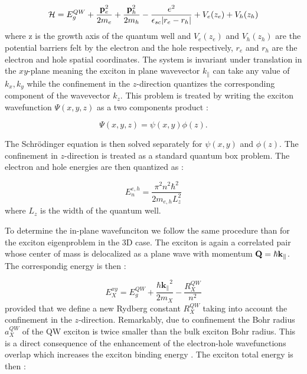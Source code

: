 \begin{equation}
    \mathcal{H} = E_g^{QW} + \dfrac{\mathbf{p}^2_e}{2m_e} + \dfrac{\mathbf{p}^2_h}{2m_h} - \dfrac{e^2}{\epsilon_{sc}|r_e-r_h|}+V_e(z_e)+V_h(z_h)
\end{equation}
where z is the growth axis of the quantum well and $V_e(z_e)$ and $V_h(z_h)$ are the potential barriers felt by the electron and the hole respectively, $r_e$ and $r_h$  are the electron and hole spatial coordinates. 
The system is invariant under translation in the $xy$-plane meaning the exciton in plane wavevector $k_{\parallel}$ can take any value of $k_x,k_y$ while the confinement in the $z$-direction quantizes the corresponding component of the wavevector $k_z$. 
This problem is treated by writing the exciton wavefunction $\Psi(x,y,z)$ as a two components product :

\begin{equation}
    \Psi(x,y,z) = \psi(x,y)\phi(z).
    \label{eq:2D_exciton_wavefunction}
\end{equation}

The Schrödinger equation is then solved separately for $\psi(x,y)$ and $\phi(z)$. 
The confinement in $z$-direction is treated as a standard quantum box problem. The electron and hole energies are then quantized as :

\begin{equation}
    E_n^{e,h} = \dfrac{\pi^2 n^2\hbar^2}{2m_{e,h}L_z^2}
    \label{eq:QW_energy_levels}
\end{equation}
where $L_z$ is the width of the quantum well.

To determine the in-plane wavefunciton we follow the same procedure than for the exciton eigenproblem in the 3D case.
The exciton is again a correlated pair whose center of mass is delocalized as a plane wave with momentum $\mathbf{Q} = \hbar \mathbf{k}_\parallel$. The correspondig energy is then  :

\begin{equation}
    E_X^{xy} = E_g^{QW} + \dfrac{\mathbf{\hbar k_{\parallel}}^2}{2m_X} - \dfrac{R_X^{QW}}{n^2}
\end{equation}
provided that we define a new Rydberg constant $R_X^{QW}$ taking into account the confinement in the $z$-direction. Remarkably, due to confinement the Bohr radius $a_X^{QW}$
of the QW exciton is twice smaller than the bulk exciton Bohr radius. This is a direct consequence of the enhancement of the electron-hole wavefunctions overlap which increases the exciton binding energy \cite{weisbuch_microcavities_1996}. The exciton total energy is then : 

